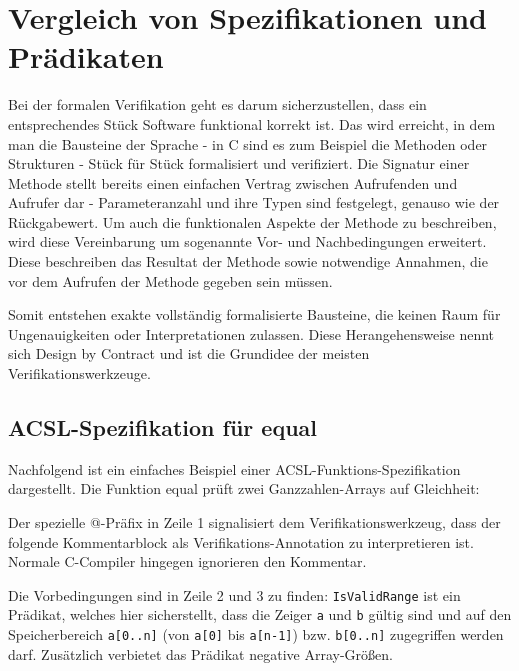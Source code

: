 ﻿\chapter{Vergleich von Spezifikationen und Prädikaten}
\label{sec:design-by-contract}

Bei der formalen Verifikation geht es darum sicherzustellen, dass ein entsprechendes Stück Software
funktional korrekt ist. Das wird erreicht, in dem man die Bausteine der Sprache - in C sind es zum Beispiel die Methoden 
oder Strukturen -
Stück für Stück formalisiert und verifiziert. Die Signatur einer Methode stellt bereits einen einfachen Vertrag zwischen
Aufrufenden und Aufrufer dar - Parameteranzahl und ihre Typen sind festgelegt, genauso wie der Rückgabewert.
Um auch die funktionalen Aspekte der Methode zu beschreiben, wird diese Vereinbarung um sogenannte Vor- und Nachbedingungen erweitert.
Diese beschreiben das Resultat der Methode sowie notwendige Annahmen, die vor dem Aufrufen der Methode gegeben sein müssen. 

Somit entstehen exakte vollständig formalisierte Bausteine, die keinen Raum für Ungenauigkeiten oder Interpretationen zulassen.
Diese Herangehensweise nennt sich Design by Contract und ist die Grundidee der meisten Verifikationswerkzeuge.



\section{ACSL-Spezifikation für equal}
\label{sec:design-by-contract:acsl-spezifikation}

Nachfolgend ist ein einfaches Beispiel einer ACSL-Funktions-Spezifikation dargestellt.
Die Funktion equal prüft zwei Ganzzahlen-Arrays auf Gleichheit:



Der spezielle @-Präfix in Zeile 1 signalisiert dem Verifikationswerkzeug, 
dass der folgende Kommentarblock als Verifikations-Annotation zu interpretieren ist. Normale C-Compiler hingegen
ignorieren den Kommentar.

Die Vorbedingungen sind in Zeile 2 und 3 zu finden: \lstinline{IsValidRange} ist ein Prädikat, welches hier sicherstellt,
dass die Zeiger \lstinline{a} und \lstinline{b} gültig sind und auf den Speicherbereich \lstinline{a[0..n]} 
(von \lstinline{a[0]} bis \lstinline{a[n-1]}) bzw. \lstinline{b[0..n]} zugegriffen 
werden darf. Zusätzlich verbietet das Prädikat negative Array-Größen.

